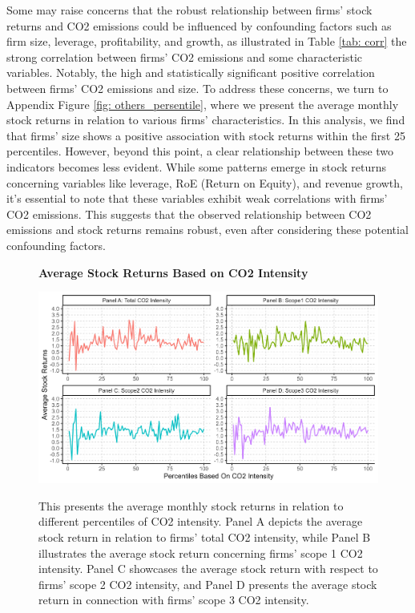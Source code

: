 \documentclass[12pt]{article}
\begin{document}
Some may raise concerns that the robust relationship between firms' stock returns and CO2 emissions could be influenced by confounding factors such as firm size, leverage, profitability, and growth, as illustrated in Table \ref{tab: corr} the strong correlation between firms' CO2 emissions and some characteristic variables. Notably, the high and statistically significant positive correlation between firms' CO2 emissions and size. To address these concerns, we turn to Appendix Figure \ref{fig: others_persentile}, where we present the average monthly stock returns in relation to various firms' characteristics. In this analysis, we find that firms' size shows a positive association with stock returns within the first 25 percentiles. However, beyond this point, a clear relationship between these two indicators becomes less evident. While some patterns emerge in stock returns concerning variables like leverage, RoE (Return on Equity), and revenue growth, it's essential to note that these variables exhibit weak correlations with firms' CO2 emissions. This suggests that the observed relationship between CO2 emissions and stock returns remains robust, even after considering these potential confounding factors.

\begin{figure}[!ht]
\centering
\caption{\textbf{Average Stock Returns Based on CO2 Intensity}}
\includegraphics{image/intensity_percentile.png}
\label{fig: intensity_percentile}
\caption*{\footnotesize{This presents the average monthly stock returns in relation to different percentiles of CO2 intensity. Panel A depicts the average stock return in relation to firms' total CO2 intensity, while Panel B illustrates the average stock return concerning firms' scope 1 CO2 intensity. Panel C showcases the average stock return with respect to firms' scope 2 CO2 intensity, and Panel D presents the average stock return in connection with firms' scope 3 CO2 intensity.}}
\end{figure}
\end{document}

